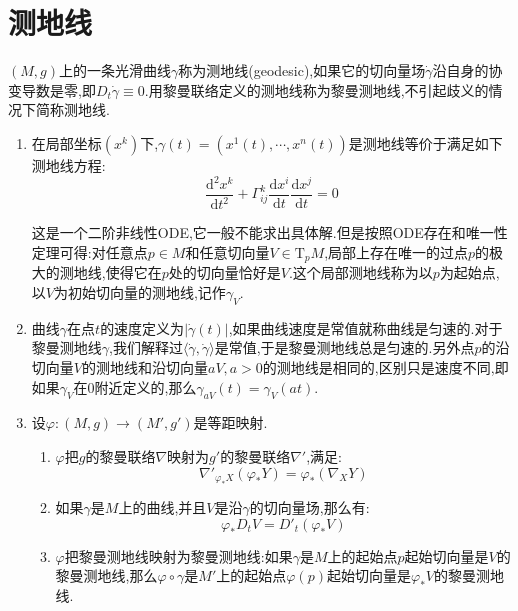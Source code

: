 \section{测地线}

$(M,g)$上的一条光滑曲线$\gamma$称为测地线(geodesic),如果它的切向量场$\dot{\gamma}$沿自身的协变导数是零,即$D_t\dot{\gamma}\equiv0$.用黎曼联络定义的测地线称为黎曼测地线,不引起歧义的情况下简称测地线.
\begin{enumerate}
	\item 在局部坐标$(x^k)$下,$\gamma(t)=(x^1(t),\cdots,x^n(t))$是测地线等价于满足如下测地线方程:
	$$\frac{\mathrm{d}^2x^k}{\mathrm{d}t^2}+\Gamma_{ij}^k\frac{\mathrm{d}x^i}{\mathrm{d}t}\frac{\mathrm{d}x^j}{\mathrm{d}t}=0$$
	
	这是一个二阶非线性ODE,它一般不能求出具体解.但是按照ODE存在和唯一性定理可得:对任意点$p\in M$和任意切向量$V\in\mathrm{T}_pM$,局部上存在唯一的过点$p$的极大的测地线,使得它在$p$处的切向量恰好是$V$.这个局部测地线称为以$p$为起始点,以$V$为初始切向量的测地线,记作$\gamma_V$.
	\item 曲线$\gamma$在点$t$的速度定义为$|\dot{\gamma}(t)|$,如果曲线速度是常值就称曲线是匀速的.对于黎曼测地线$\gamma$,我们解释过$\langle\dot{\gamma},\dot{\gamma}\rangle$是常值,于是黎曼测地线总是匀速的.另外点$p$的沿切向量$V$的测地线和沿切向量$aV,a>0$的测地线是相同的,区别只是速度不同,即如果$\gamma_V$在0附近定义的,那么$\gamma_{aV}(t)=\gamma_V(at)$.
	\item 设$\varphi:(M,g)\to(M',g')$是等距映射.
	\begin{enumerate}
		\item $\varphi$把$g$的黎曼联络$\nabla$映射为$g'$的黎曼联络$\nabla'$,满足:
		$$\nabla'_{\varphi_*X}(\varphi_*Y)=\varphi_*(\nabla_XY)$$
		\item 如果$\gamma$是$M$上的曲线,并且$V$是沿$\gamma$的切向量场,那么有:
		$$\varphi_*D_tV=D'_t(\varphi_*V)$$
		\item $\varphi$把黎曼测地线映射为黎曼测地线:如果$\gamma$是$M$上的起始点$p$起始切向量是$V$的黎曼测地线,那么$\varphi\circ\gamma$是$M'$上的起始点$\varphi(p)$起始切向量是$\varphi_*V$的黎曼测地线.
	\end{enumerate}
\end{enumerate}

